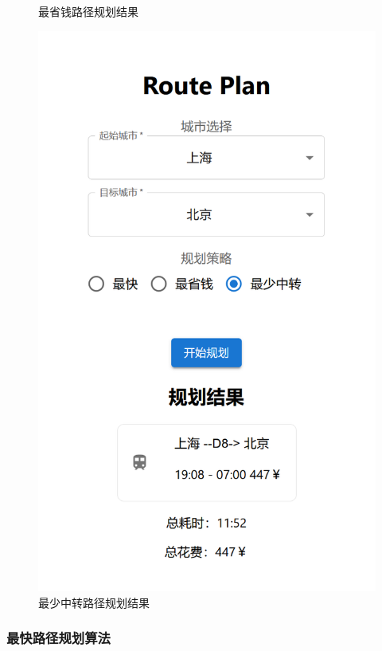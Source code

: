 \documentclass[10pt]{article}
\begin{document}
\begin{figure}[htbp]
\begin{minipage}[b]{0.45\linewidth}
            \caption{最省钱路径规划结果}
            \label{fig:screenshot002}
        \end{minipage}
        \hspace{0.05\linewidth}
        \begin{minipage}[b]{0.45\linewidth}
            \centering
            \includegraphics[width=\linewidth]{img/screenshot003}
            \caption{最少中转路径规划结果}
            \label{fig:screenshot003}
        \end{minipage}
    \end{figure}

    \subsubsection{最快路径规划算法}
\end{document}
